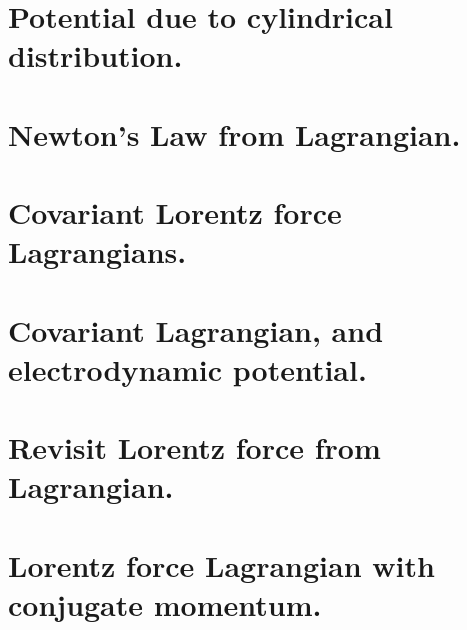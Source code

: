\chapter{Potential due to cylindrical distribution.}
   
\chapter{Newton's Law from Lagrangian.}
\chapter{Covariant Lorentz force Lagrangians.}
   
\chapter{Covariant Lagrangian, and electrodynamic potential.}
\chapter{Revisit Lorentz force from Lagrangian.}
\chapter{Lorentz force Lagrangian with conjugate momentum.}

\EndNoBibArticle
